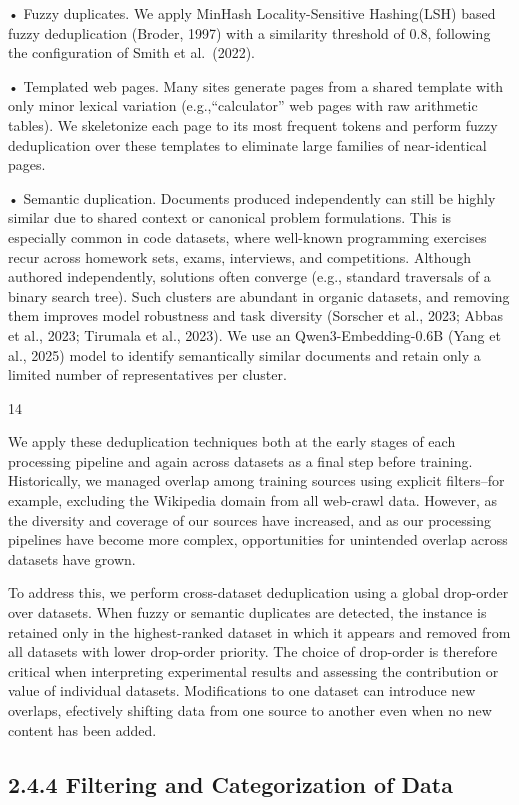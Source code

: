\documentclass[
  10
]{article}
\begin{document}
• Fuzzy duplicates. We apply MinHash Locality-Sensitive Hashing(LSH)
based fuzzy deduplication (Broder, 1997) with a similarity threshold of
0.8, following the configuration of Smith et al.~(2022).

• Templated web pages. Many sites generate pages from a shared template
with only minor lexical variation (e.g.,``calculator'' web pages with
raw arithmetic tables). We skeletonize each page to its most frequent
tokens and perform fuzzy deduplication over these templates to eliminate
large families of near-identical pages.

• Semantic duplication. Documents produced independently can still be
highly similar due to shared context or canonical problem formulations.
This is especially common in code datasets, where well-known programming
exercises recur across homework sets, exams, interviews, and
competitions. Although authored independently, solutions often converge
(e.g., standard traversals of a binary search tree). Such clusters are
abundant in organic datasets, and removing them improves model
robustness and task diversity (Sorscher et al., 2023; Abbas et al.,
2023; Tirumala et al., 2023). We use an Qwen3-Embedding-0.6B (Yang et
al., 2025) model to identify semantically similar documents and retain
only a limited number of representatives per cluster.

14

We apply these deduplication techniques both at the early stages of each
processing pipeline and again across datasets as a final step before
training. Historically, we managed overlap among training sources using
explicit filters--for example, excluding the Wikipedia domain from all
web-crawl data. However, as the diversity and coverage of our sources
have increased, and as our processing pipelines have become more
complex, opportunities for unintended overlap across datasets have
grown.

To address this, we perform cross-dataset deduplication using a global
drop-order over datasets. When fuzzy or semantic duplicates are
detected, the instance is retained only in the highest-ranked dataset in
which it appears and removed from all datasets with lower drop-order
priority. The choice of drop-order is therefore critical when
interpreting experimental results and assessing the contribution or
value of individual datasets. Modifications to one dataset can introduce
new overlaps, efectively shifting data from one source to another even
when no new content has been added.

\subsection{2.4.4 Filtering and Categorization of
Data}\label{filtering-and-categorization-of-data}
\end{document}
